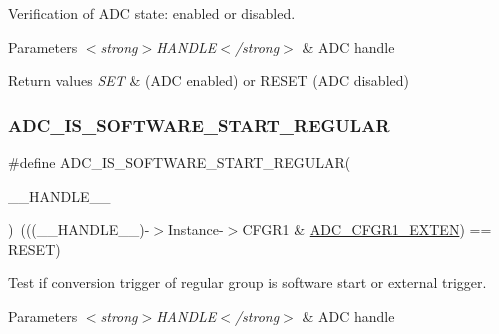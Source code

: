 Verification of A\+DC state\+: enabled or disabled. 


\begin{DoxyParams}{Parameters}
{\em $<$strong$>$\+H\+A\+N\+D\+L\+E$<$/strong$>$} & A\+DC handle \\
\hline
\end{DoxyParams}

\begin{DoxyRetVals}{Return values}
{\em S\+ET} & (A\+DC enabled) or R\+E\+S\+ET (A\+DC disabled) \\
\hline
\end{DoxyRetVals}
\mbox{\label{group___a_d_c___private___macros_ga2ccb82ecf85d6c6d1ff2cdf9b6a82d2b}} 
\subsubsection{\texorpdfstring{A\+D\+C\+\_\+\+I\+S\+\_\+\+S\+O\+F\+T\+W\+A\+R\+E\+\_\+\+S\+T\+A\+R\+T\+\_\+\+R\+E\+G\+U\+L\+AR}{ADC\_IS\_SOFTWARE\_START\_REGULAR}}
{\footnotesize\ttfamily \#define A\+D\+C\+\_\+\+I\+S\+\_\+\+S\+O\+F\+T\+W\+A\+R\+E\+\_\+\+S\+T\+A\+R\+T\+\_\+\+R\+E\+G\+U\+L\+AR(\begin{DoxyParamCaption}\item[{}]{\+\_\+\+\_\+\+H\+A\+N\+D\+L\+E\+\_\+\+\_\+ }\end{DoxyParamCaption})~(((\+\_\+\+\_\+\+H\+A\+N\+D\+L\+E\+\_\+\+\_\+)-\/$>$Instance-\/$>$C\+F\+G\+R1 \& \hyperlink{group___peripheral___registers___bits___definition_gafc48e957d935d791a767c763b9225832}{A\+D\+C\+\_\+\+C\+F\+G\+R1\+\_\+\+E\+X\+T\+EN}) == R\+E\+S\+ET)}



Test if conversion trigger of regular group is software start or external trigger. 


\begin{DoxyParams}{Parameters}
{\em $<$strong$>$\+H\+A\+N\+D\+L\+E$<$/strong$>$} & A\+DC handle \\
\hline
\end{DoxyParams}

